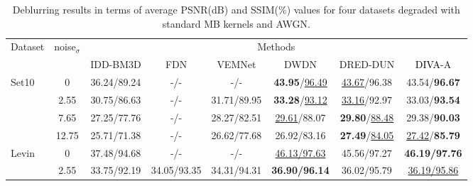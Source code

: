 \documentclass[10pt,journal,compsoc]{IEEEtran}
\newcommand\bdr[1]{{\textbf{#1}}}
\newcommand\bdb[1]{{\underline{#1}}}
\newcommand{\sd}{\textcolor{black}}
\newcommand{\dk}{\textcolor{black}}
\begin{document}
\begin{table}[t!]
\setlength\tabcolsep{2pt}

\begin{tiny}
\begin{center}
\caption{Deblurring results in terms of average PSNR(dB) and SSIM(\%) values for four datasets degraded with standard MB kernels and AWGN.
}
\label{tab:tab_psnr_ssim_motion_deblur}
\begin{tabular}{l c cccccc}
\hline

Dataset & noise$_{\sigma}$ & \multicolumn{6}{c}{Methods}\\

& & IDD-BM3D\cite{Danielyan2012bm3d} & FDN\cite{Kruse2017learning} & VEMNet\cite{Nan2020variational} & DWDN\cite{Dong2020deep} & DRED-DUN\cite{Kong2022deep} & \dk{DIVA}-A \\
\hline

\multirow{4}{*}{Set10}

& 0    & 36.24/89.24  & -/- & -/- & \bdr{43.95}/\bdb{96.49} & \bdb{43.67}/96.38 & 43.54/\bdr{96.67} \\

& 2.55 & 30.75/86.63  & -/- & 31.71/89.95 & \bdr{33.28}/\bdb{93.12} & \bdb{33.16}/92.97 & 33.03/\bdr{93.54} \\

& 7.65 & 27.25/77.76  & -/- & 28.27/82.51 & \bdb{29.61}/88.07 & \bdr{29.80}/\bdb{88.48} & 29.38/\bdr{90.03} \\

& 12.75 & 25.71/71.38 & -/- & 26.62/77.68 & 26.92/83.16 & \bdr{27.49}/\bdb{84.05} & \bdb{27.42}/\bdr{85.79} \\

\hline


\multirow{4}{*}{Levin}

& 0 & 37.48/94.68  & -/-  & -/- & \bdb{46.13/97.63} & 45.56/97.27 & \bdr{46.19/97.76} \\

& 2.55 & 33.75/92.19  & 34.05/93.35 & 34.31/94.31 & \bdr{36.90/96.14} & 36.02/95.79 & \bdb{36.19/95.86} \\


\end{tabular}
\end{center}
\end{tiny}
\end{table}
\end{document}
